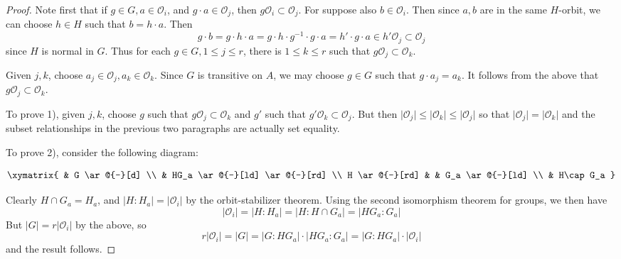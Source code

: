 \documentclass[12pt]{article}
\begin{document}
\begin{proof}
Note first that if $g\in G, a\in \mathcal{O}_i$, and $g\cdot a\in \mathcal{O}_j$, then $g\mathcal{O}_i\subset\mathcal{O}_j$. For suppose also $b\in \mathcal{O}_i$. Then since $a,b$ are in the same $H$-orbit, we can choose $h\in H$ such that $b=h\cdot a$. Then
\[g\cdot b=g\cdot h\cdot a = g\cdot h\cdot g^{-1}\cdot g\cdot a = h'\cdot g\cdot a\in h'\mathcal{O}_j\subset\mathcal{O}_j\]
since $H$ is normal in $G$. Thus for each $g\in G, 1\leq j\leq r$, there is $1\leq k\leq r$ such that $g\mathcal{O}_j\subset\mathcal{O}_k$.

Given $j, k$, choose $a_j\in\mathcal{O}_j, a_k\in\mathcal{O}_k$. Since $G$ is transitive on $A$, we may choose $g\in G$ such that $g\cdot a_j = a_k$. It follows from the above that $g\mathcal{O}_j\subset\mathcal{O}_k$. 

To prove 1), given $j,k$, choose $g$ such that $g\mathcal{O}_j\subset\mathcal{O}_k$ and $g'$ such that $g'\mathcal{O}_k\subset\mathcal{O}_j$. But then $\lvert\mathcal{O}_j\rvert\leq\lvert\mathcal{O}_k\rvert\leq\lvert\mathcal{O}_j\rvert$ so that $\lvert\mathcal{O}_j\rvert=\lvert\mathcal{O}_k\rvert$ and the subset relationships in the previous two paragraphs are actually set equality.

To prove 2), consider the following diagram:
\begin{center}
\[
\xymatrix{
& G \ar@{-}[d] \\
& HG_a \ar@{-}[ld] \ar@{-}[rd] \\
H \ar@{-}[rd] & & G_a \ar@{-}[ld] \\
& H\cap G_a
}
\]
\end{center}
Clearly $H\cap G_a=H_a$, and $\lvert H:H_a\rvert = \lvert \mathcal{O}_i\rvert$ by the orbit-stabilizer theorem. Using the second isomorphism theorem for groups, we then have
\[\lvert\mathcal{O}_i\rvert = \lvert H:H_a\rvert = \lvert H:H\cap G_a\rvert = \lvert HG_a:G_a\rvert\]
But $\lvert G\rvert=r\lvert\mathcal{O}_i\rvert$ by the above, so
\[r\lvert\mathcal{O}_i\rvert=\lvert G\rvert=\lvert G:HG_a\rvert\cdot\lvert HG_a:G_a\rvert=\lvert G:HG_a\rvert\cdot\lvert\mathcal{O}_i\rvert\]
and the result follows.
\end{proof}
\end{document}
